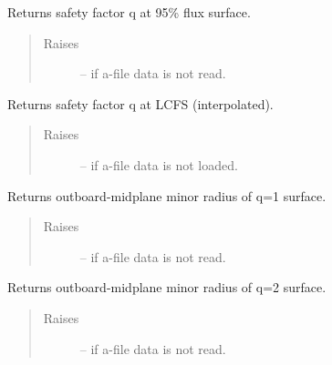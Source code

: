 \documentclass[letterpaper,10pt,english]{sphinxmanual}
\begin{document}
\begin{fulllineitems}
\begin{fulllineitems}
\label{eqtools:eqtools.eqdskreader.EqdskReader.getQ95}
Returns safety factor q at 95\% flux surface.
\begin{quote}\begin{description}
\item[{Raises }] \leavevmode
{} -- 
if a-file data is not read.

\end{description}\end{quote}

\end{fulllineitems}


\begin{fulllineitems}
\label{eqtools:eqtools.eqdskreader.EqdskReader.getQLCFS}
Returns safety factor q at LCFS (interpolated).
\begin{quote}\begin{description}
\item[{Raises }] \leavevmode
{} -- 
if a-file data is not loaded.

\end{description}\end{quote}

\end{fulllineitems}


\begin{fulllineitems}
\label{eqtools:eqtools.eqdskreader.EqdskReader.getQ1Surf}
Returns outboard-midplane minor radius of q=1 surface.
\begin{quote}\begin{description}
\item[{Raises }] \leavevmode
{} -- 
if a-file data is not read.

\end{description}\end{quote}

\end{fulllineitems}


\begin{fulllineitems}
\label{eqtools:eqtools.eqdskreader.EqdskReader.getQ2Surf}
Returns outboard-midplane minor radius of q=2 surface.
\begin{quote}\begin{description}
\item[{Raises }] \leavevmode
{} -- 
if a-file data is not read.


\end{description}
\end{quote}
\end{fulllineitems}
\end{fulllineitems}
\end{document}
